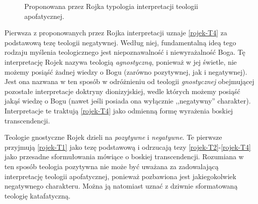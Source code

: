 \begin{figure}[H]
\begin{center}

\caption[Typologia teologii apofatycznej według Rojka]{Proponowana przez Rojka
typologia interpretacji teologii apofatycznej\footnotemark.}\label{roj-typ-rys}
\end{center}
\end{figure}




Pierwsza z proponowanych przez Rojka interpretacji uznaje \eqref{rojek-T4} za
podstawową tezę teologii negatywnej. Według niej, fundamentalną ideą tego
rodzaju myślenia teologicznego jest niepoznawalność i niewyrażalność
Boga. Tę interpretację Rojek nazywa teologią \textit{agnostyczną},
ponieważ w jej świetle, nie możemy posiąść żadnej wiedzy o Bogu
(zarówno pozytywnej, jak i negatywnej). Jest ona nazwana w ten sposób w
odróżnieniu od teologii \textit{gnostycznej} obejmującej pozostałe
interpretacje doktryny dionizyjskiej, wedle których możemy posiąść
jakąś wiedzę o Bogu (nawet jeśli posiada ona wyłącznie ,,negatywny''
charakter). Interpretacje te traktują \eqref{rojek-T4} jako odmienną formę wyrażenia
boskiej transcendencji.

Teologie gnostyczne Rojek dzieli na \textit{pozytywne} i
\textit{negatywne}. Te pierwsze przyjmują \eqref{rojek-T1} jako tezę podstawową i
odrzucają tezy \eqref{rojek-T2}-\eqref{rojek-T4} jako przesadne sformułowania mówiące o
boskiej transcendencji. Rozumiana w ten sposób teologia pozytywna nie
może być uważana za zadowalającą interpretację teologii apofatycznej,
ponieważ pozbawiona jest jakiegokolwiek negatywnego charakteru.
Można ją natomiast uznać z dziwnie sformatowaną teologię
katafatyczną.




